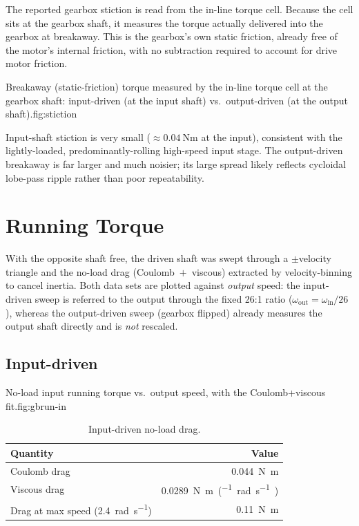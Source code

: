 \documentclass[11pt]{article}
\begin{document}
The reported gearbox stiction is read from the in-line torque cell.
Because the cell sits at the gearbox shaft, it measures the torque actually
delivered into the gearbox at breakaway. This is the gearbox's own static friction,
already free of the motor's internal friction, with no subtraction required to account for drive motor friction.

  {Breakaway (static-friction) torque measured by the in-line torque cell at the
   gearbox shaft: input-driven (at the input shaft) vs.\ output-driven (at the
   output shaft).}{fig:stiction}

Input-shaft stiction is very small ($\approx\SI{0.04}{\newton\meter}$ at the
input), consistent with the lightly-loaded, predominantly-rolling high-speed input
stage. The output-driven breakaway is far larger and much noisier; its large
spread likely reflects cycloidal lobe-pass ripple rather than poor repeatability.

\section{Running Torque}\label{sec:gbrunning}
With the opposite shaft free, the driven shaft was swept through a $\pm$velocity
triangle and the no-load drag (Coulomb~$+$~viscous) extracted by velocity-binning
to cancel inertia. Both data sets are plotted against \emph{output} speed: the
input-driven sweep is referred to the output through the fixed 26:1 ratio
($\omega_\text{out}=\omega_\text{in}/26$), whereas the output-driven sweep (gearbox
flipped) already measures the output shaft directly and is \emph{not} rescaled.

\subsection{Input-driven}
  {No-load input running torque vs.\ output speed, with the Coulomb+viscous fit.}{fig:gbrun-in}

\begin{table}[H]
  \centering
  \caption{Input-driven no-load drag.}
  \begin{tabular}{lr}
    \toprule
    Quantity & Value\\
    \midrule
    Coulomb drag         & \SI{0.044}{\newton\meter}\\
    Viscous drag         & \SI{0.0289}{\newton\meter\per(\radian\per\second)}\\
    Drag at max speed (\SI{2.4}{\radian\per\second}) & \SI{0.11}{\newton\meter}\\
    \bottomrule
  \end{tabular}
\end{table}
\end{document}

